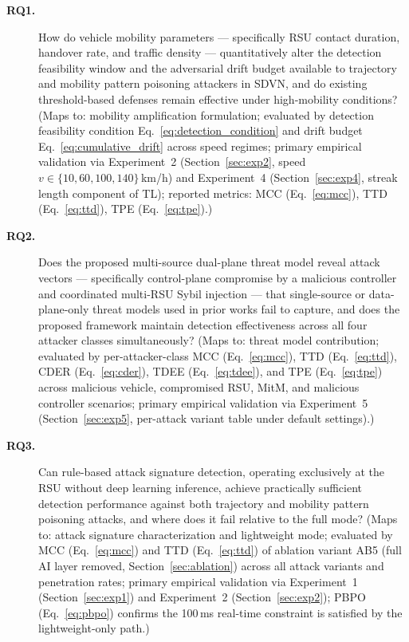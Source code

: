 \documentclass[12pt, a4paper]{report}
\begin{document}
\begin{description}

\item[\textbf{RQ1.}] How do vehicle mobility parameters --- specifically
RSU contact duration, handover rate, and traffic density --- quantitatively
alter the detection feasibility window and the adversarial drift budget
available to trajectory and mobility pattern poisoning attackers in SDVN,
and do existing threshold-based defenses remain effective under
high-mobility conditions?
(Maps to: mobility amplification formulation; evaluated by
detection feasibility condition Eq.~\eqref{eq:detection_condition} and
drift budget Eq.~\eqref{eq:cumulative_drift} across speed regimes;
primary empirical validation via Experiment~2
(Section~\ref{sec:exp2}, speed $v \in \{10, 60, 100, 140\}$\,km/h)
and Experiment~4 (Section~\ref{sec:exp4}, streak length component
of TL); reported metrics: MCC (Eq.~\ref{eq:mcc}),
TTD (Eq.~\ref{eq:ttd}), TPE (Eq.~\ref{eq:tpe}).)

\item[\textbf{RQ2.}] Does the proposed multi-source dual-plane threat model
reveal attack vectors --- specifically control-plane compromise by a malicious
controller and coordinated multi-RSU Sybil injection --- that single-source
or data-plane-only threat models used in prior works fail to capture, and
does the proposed framework maintain detection effectiveness across all four
attacker classes simultaneously?
(Maps to: threat model contribution; evaluated by per-attacker-class
MCC (Eq.~\ref{eq:mcc}), TTD (Eq.~\ref{eq:ttd}),
CDER (Eq.~\ref{eq:cder}), TDEE (Eq.~\ref{eq:tdee}),
and TPE (Eq.~\ref{eq:tpe})
across malicious vehicle, compromised RSU, MitM, and malicious
controller scenarios; primary empirical validation via
Experiment~5 (Section~\ref{sec:exp5}, per-attack variant table
under default settings).)

\item[\textbf{RQ3.}] Can rule-based attack signature detection, operating
exclusively at the RSU without deep learning inference, achieve practically
sufficient detection performance against both trajectory and mobility
pattern poisoning attacks, and where does it fail relative to the full mode?
(Maps to: attack signature characterization and lightweight mode;
evaluated by MCC (Eq.~\ref{eq:mcc}) and TTD (Eq.~\ref{eq:ttd})
of ablation variant AB5 (full AI layer removed,
Section~\ref{sec:ablation}) across all attack variants and
penetration rates; primary empirical validation via
Experiment~1 (Section~\ref{sec:exp1}) and
Experiment~2 (Section~\ref{sec:exp2}); PBPO
(Eq.~\ref{eq:pbpo}) confirms the 100\,ms real-time constraint
is satisfied by the lightweight-only path.)


\end{description}
\end{document}
